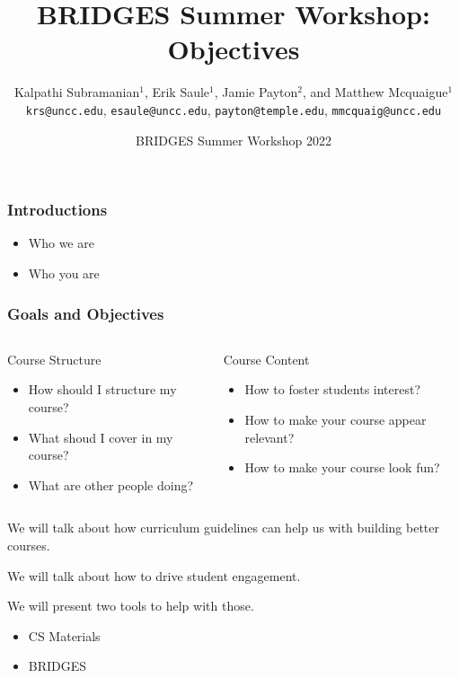 \documentclass[aspectratio=169]{beamer}
\title[Objectives]{BRIDGES Summer Workshop:\\Objectives}
\subtitle{}
\author{Kalpathi Subramanian$^1$, Erik Saule$^1$, Jamie Payton$^2$, and Matthew Mcquaigue$^1$ \\\texttt{krs@uncc.edu}, \texttt{esaule@uncc.edu}, \texttt{payton@temple.edu}, \texttt{mmcquaig@uncc.edu}}
\institute{$^1$The University of North Carolina at Charlotte\\$^2$Temple University}
\date{BRIDGES Summer Workshop 2022}
\begin{document}
\begin{frame}
\titlepage

\end{frame}


\begin{frame}
  \frametitle{Introductions}

  \begin{itemize}
  \item Who we are
  \item Who you are
  \end{itemize}
\end{frame}

\begin{frame}
  \frametitle{Goals and Objectives}

  \begin{columns}
    \begin{block}{Course Structure}
      \begin{itemize}
      \item How should I structure my course?
      \item What shoud I cover in my course?
      \item What are other people doing?
      \end{itemize}
    \end{block}
    
    \begin{block}{Course Content}
      \begin{itemize}
      \item How to foster students interest?
      \item How to make your course appear relevant?
      \item How to make your course look fun?
      \end{itemize}
    \end{block}
    
  \end{columns}

  We will talk about how curriculum guidelines can help us with
  building better courses.
  
  We will talk about how to drive student engagement.
  
  We will present two tools to help with those.
  \begin{itemize}
  \item CS Materials
  \item BRIDGES
  \end{itemize}
\end{frame}
\end{document}
